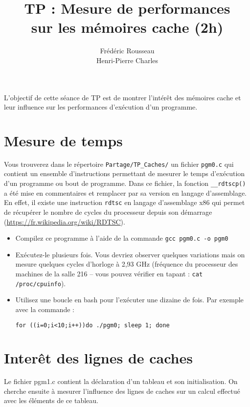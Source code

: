 \documentclass{article}
\title{TP : Mesure de performances\\sur les mémoires cache (2h)}
\author{Frédéric Rousseau \\Henri-Pierre Charles}
\newcommand{\TODO}[1]{\marginpar{\textcolor{RED}{#1}}}
\begin{document}
\sffamily %
\allsectionsfont{\sffamily}
\maketitle

L’objectif de cette séance de TP est de montrer l’intérêt des mémoires
cache et leur influence sur les performances d’exécution d’un
programme.

\section{Mesure de temps}
Vous trouverez dans le répertoire \texttt{Partage/TP\_Caches/} un
fichier \texttt{pgm0.c} qui contient un ensemble d’instructions
permettant de mesurer le temps d’exécution d’un programme ou bout de
programme. Dans ce fichier, la fonction \texttt{\_\_rdtscp()} a été
mise en commentaires et remplacer par sa version en langage
d’assemblage. En effet, il existe une instruction \texttt{rdtsc} en
langage d’assemblage x86 qui permet de récupérer le nombre de cycles
du processeur depuis son démarrage
(\href{https://fr.wikipedia.org/wiki/RDTSC}{https://fr.wikipedia.org/wiki/RDTSC}). 

\begin{itemize}
\item Compilez ce programme à l’aide de la commande \texttt{gcc pgm0.c
    -o pgm0}

\item Exécutez-le plusieurs fois. Vous devriez observer quelques
variations mais on mesure quelques cycles d’horloge à 2,93 GHz
(fréquence du processeur des machines de la salle 216 – vous pouvez
vérifier en tapant : \texttt{cat /proc/cpuinfo}).

\item Utilisez une boucle en bash pour l’exécuter une
dizaine de fois. Par exemple avec la commande : 

\texttt{for ((i=0;i<10;i++))do ./pgm0; sleep 1; done}
\end{itemize}

\section{Interêt des lignes de caches}

Le fichier pgm1.c contient la déclaration d’un tableau et son
initialisation. On cherche ensuite à mesurer l’influence des lignes de
caches sur un calcul effectué avec les éléments de ce tableau. 
\end{document}
